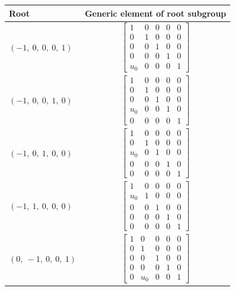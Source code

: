 \documentclass[11pt]{article}
\theoremstyle{definition}
\begin{document}
\noindent \begin{longtable}{|l|c|}
    \hline
    \textbf{Root} & \textbf{Generic element of root subgroup} \\
    \hline
    \endhead
    $\left( -1, \  0, \  0, \  0, \  1\right)$ & ${\left[\begin{matrix}1 & 0 & 0 & 0 & 0\\0 & 1 & 0 & 0 & 0\\0 & 0 & 1 & 0 & 0\\0 & 0 & 0 & 1 & 0\\u_{0} & 0 & 0 & 0 & 1\end{matrix}\right]}$ \\
    \hline
    $\left( -1, \  0, \  0, \  1, \  0\right)$ & ${\left[\begin{matrix}1 & 0 & 0 & 0 & 0\\0 & 1 & 0 & 0 & 0\\0 & 0 & 1 & 0 & 0\\u_{0} & 0 & 0 & 1 & 0\\0 & 0 & 0 & 0 & 1\end{matrix}\right]}$ \\
    \hline
    $\left( -1, \  0, \  1, \  0, \  0\right)$ & ${\left[\begin{matrix}1 & 0 & 0 & 0 & 0\\0 & 1 & 0 & 0 & 0\\u_{0} & 0 & 1 & 0 & 0\\0 & 0 & 0 & 1 & 0\\0 & 0 & 0 & 0 & 1\end{matrix}\right]}$ \\
    \hline
    $\left( -1, \  1, \  0, \  0, \  0\right)$ & ${\left[\begin{matrix}1 & 0 & 0 & 0 & 0\\u_{0} & 1 & 0 & 0 & 0\\0 & 0 & 1 & 0 & 0\\0 & 0 & 0 & 1 & 0\\0 & 0 & 0 & 0 & 1\end{matrix}\right]}$ \\
    \hline
    $\left( 0, \  -1, \  0, \  0, \  1\right)$ & ${\left[\begin{matrix}1 & 0 & 0 & 0 & 0\\0 & 1 & 0 & 0 & 0\\0 & 0 & 1 & 0 & 0\\0 & 0 & 0 & 1 & 0\\0 & u_{0} & 0 & 0 & 1\end{matrix}\right]}$ \\

\end{longtable}
\end{document}
